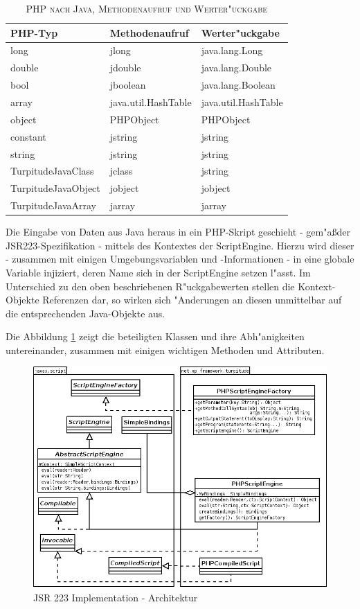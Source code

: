 \begin{table}
\label{tab:phptojava}
\caption{\textsc{PHP nach Java, Methodenaufruf und Werter"uckgabe}}
\begin{tabular}[tbh]{|l|l|l|}
\hline
PHP-Typ & Methodenaufruf & Werter"uckgabe\\
\hline\hline
long & jlong & java.lang.Long \\
double & jdouble & java.lang.Double \\
bool & jboolean  & java.lang.Boolean \\
array & java.util.HashTable & java.util.HashTable \\
object & PHPObject & PHPObject\\
constant & jstring & jstring\\
string & jstring & jstring \\
TurpitudeJavaClass & jclass & jstring\\
TurpitudeJavaObject & jobject & jobject\\
TurpitudeJavaArray & jarray & jarray\\
\hline
\end{tabular}
\end{table}

Die Eingabe von Daten aus Java heraus in ein PHP-Skript geschieht - gem"a\ss der JSR223-Spezifikation - mittels des Kontextes der
ScriptEngine. Hierzu wird dieser - zusammen mit einigen Umgebungsvariablen und -Informationen - in eine globale Variable injiziert,
deren Name sich in der ScriptEngine setzen l"asst. Im Unterschied zu den oben beschriebenen R"uckgabewerten stellen die Kontext-Objekte
Referenzen dar, so wirken sich "Anderungen an diesen unmittelbar auf die entsprechenden Java-Objekte aus.

Die Abbildung \ref{fig:jsr223impl} zeigt die beteiligten Klassen und ihre Abh"anigkeiten untereinander,
zusammen mit einigen wichtigen Methoden und Attributen. 

\begin{figure}[h]
\includegraphics[width=\textwidth]{chap1/img/turpitude.png}
\caption{JSR 223 Implementation - Architektur}
\label{fig:jsr223impl}
\end{figure}

